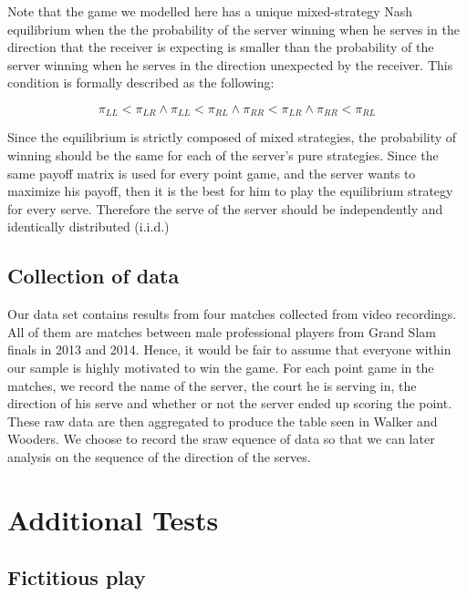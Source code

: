 \documentclass[11pt]{article}
\begin{document}
Note that the game we modelled here has a unique mixed-strategy Nash equilibrium when the the probability of the server winning when he serves in the direction that the receiver is expecting is smaller than the probability of the server winning when he serves in the direction unexpected by the receiver. This condition is formally described as the following:

\begin{equation*}
\pi_{LL} < \pi_{LR} \land
\pi_{LL} < \pi_{RL} \land
\pi_{RR} < \pi_{LR} \land
\pi_{RR} < \pi_{RL}
\end{equation*}

Since the equilibrium is strictly composed of mixed strategies, the probability of winning should be the same for each of the server's pure strategies.  Since the same payoff matrix is used for every point game, and the server wants to maximize his payoff, then it is the best for him to play the equilibrium strategy for every serve. Therefore the serve of the server should be independently and identically distributed (i.i.d.)

\subsection{Collection of data}

Our data set contains results from four matches collected from video recordings. All of them are matches between male professional players from Grand Slam finals in 2013 and 2014.  Hence, it would be fair to assume that everyone within our sample is highly motivated to win the game. For each point game in the matches, we record the name of the server, the court he is serving in, the direction of his serve and whether or not the server ended up scoring the point. These raw data are then aggregated to produce the table seen in Walker and Wooders.  We choose to record the sraw equence of data  so that we can later analysis on the sequence of the direction of the serves. 

\section{Additional Tests}

\subsection{Fictitious play}
\end{document}
